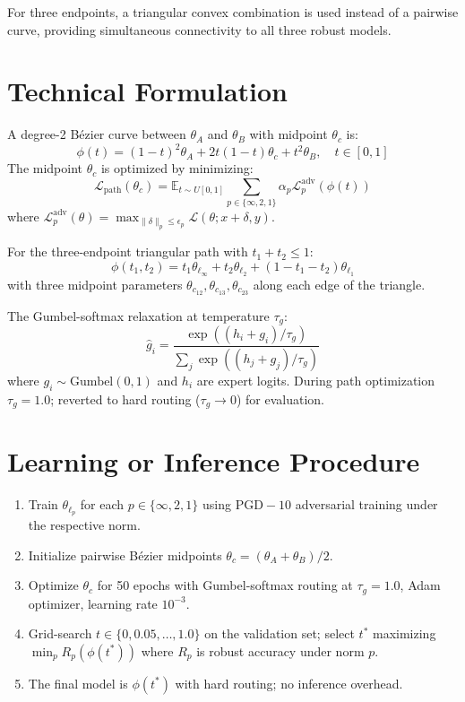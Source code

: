 \documentclass[10pt,twocolumn]{article}
\begin{document}
For three endpoints, a triangular convex combination is used instead
of a pairwise curve, providing simultaneous connectivity to all three
robust models.

\section{Technical Formulation}

A degree-2 Bézier curve between $\theta_A$ and $\theta_B$ with
midpoint $\theta_c$ is:
\[
  \phi(t) = (1-t)^2 \theta_A + 2t(1-t) \theta_c + t^2 \theta_B,
  \quad t \in [0,1]
\]
The midpoint $\theta_c$ is optimized by minimizing:
\[
  \mathcal{L}_\text{path}(\theta_c) = \mathbb{E}_{t \sim U[0,1]}
    \sum_{p \in \{\infty,2,1\}} \alpha_p
    \mathcal{L}_p^\text{adv}(\phi(t))
\]
where $\mathcal{L}_p^\text{adv}(\theta) = \max_{\|\delta\|_p \leq \epsilon_p}
\mathcal{L}(\theta; x+\delta, y)$.

For the three-endpoint triangular path with $t_1 + t_2 \leq 1$:
\[
  \phi(t_1, t_2) = t_1 \theta_{\ell_\infty} + t_2 \theta_{\ell_2}
    + (1-t_1-t_2) \theta_{\ell_1}
\]
with three midpoint parameters $\theta_{c_{12}}, \theta_{c_{13}},
\theta_{c_{23}}$ along each edge of the triangle.

The Gumbel-softmax relaxation at temperature $\tau_g$:
\[
  \hat{g}_i = \frac{\exp((h_i + g_i)/\tau_g)}{\sum_j \exp((h_j + g_j)/\tau_g)}
\]
where $g_i \sim \text{Gumbel}(0,1)$ and $h_i$ are expert logits.
During path optimization $\tau_g = 1.0$; reverted to hard routing
($\tau_g \to 0$) for evaluation.

\section{Learning or Inference Procedure}

\begin{enumerate}[itemsep=2pt,parsep=0pt]
  \item Train $\theta_{\ell_p}$ for each $p \in \{\infty, 2, 1\}$
    using $\text{PGD}-10$ adversarial training under the respective norm.
  \item Initialize pairwise Bézier midpoints $\theta_c = (\theta_A + \theta_B)/2$.
  \item Optimize $\theta_c$ for 50 epochs with Gumbel-softmax routing
    at $\tau_g = 1.0$, Adam optimizer, learning rate $10^{-3}$.
  \item Grid-search $t \in \{0, 0.05, \ldots, 1.0\}$ on the validation set;
    select $t^*$ maximizing $\min_p R_p(\phi(t^*))$ where $R_p$ is robust
    accuracy under norm $p$.
  \item The final model is $\phi(t^*)$ with hard routing; no inference overhead.
\end{enumerate}
\end{document}
